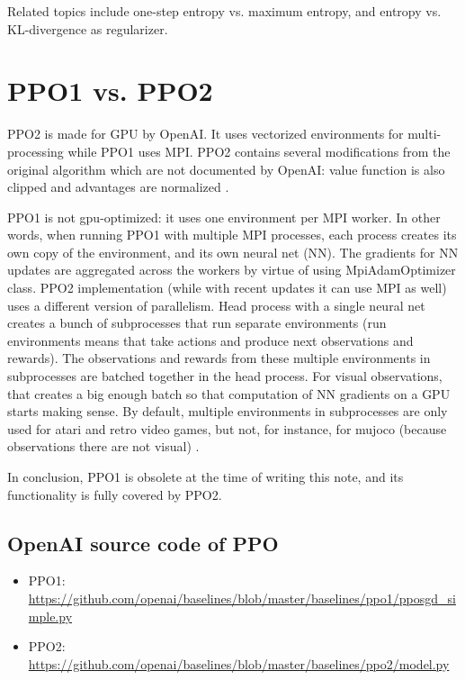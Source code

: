 \documentclass[lang=en,mode=normal,device=normal,color=blue,12pt]{elegantnote}
\DeclareMathOperator*{\1}{\mathbbm{1}}
\begin{document}
\begin{appendices}
Related topics include one-step entropy vs. maximum entropy, and entropy vs. KL-divergence as regularizer.

\newpage
\section{PPO1 vs. PPO2}

PPO2 is made for GPU by OpenAI. It uses vectorized environments for multi-processing while PPO1 uses MPI. PPO2 contains several modifications from the original algorithm which are not documented by OpenAI: value function is also clipped and advantages are normalized \cite{ppo2stable}.

PPO1 is not gpu-optimized: it uses one environment per MPI worker. In other words, when running PPO1 with multiple MPI processes, each process creates its own copy of the environment, and its own neural net (NN). The gradients for NN updates are aggregated across the workers by virtue of using MpiAdamOptimizer class.
PPO2 implementation (while with recent updates it can use MPI as well) uses a different version of parallelism. Head process with a single neural net creates a bunch of subprocesses that run separate environments (run environments means that take actions and produce next observations and rewards).
The observations and rewards from these multiple environments in subprocesses are batched together in the head process.
For visual observations, that creates a big enough batch so that computation of NN gradients on a GPU starts making sense.
By default, multiple environments in subprocesses are only used for atari and retro video games, but not, for instance, for mujoco (because observations there are not visual) \cite{ppo2vsppo1}.

In conclusion, PPO1 is obsolete at the time of writing this note, and its functionality is fully covered by PPO2.

\subsection{OpenAI source code of PPO}

\begin{itemize}
\item PPO1: \url{https://github.com/openai/baselines/blob/master/baselines/ppo1/pposgd_simple.py}
\item PPO2: \url{https://github.com/openai/baselines/blob/master/baselines/ppo2/model.py}
\end{itemize}

\end{appendices}



\newpage

\end{document}
